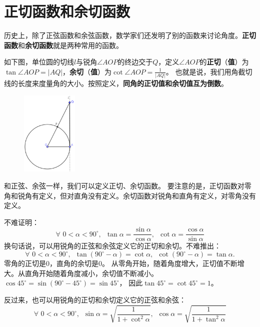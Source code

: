 \documentclass[12pt,UTF8]{ctexbook}
\begin{document}
\section{正切函数和余切函数}

历史上，除了正弦函数和余弦函数，数学家们还发明了别的函数来讨论角度。\textbf{正切函数}和\textbf{余切函数}就是两种常用的函数。

如下图，单位圆的切线$l$与锐角$\angle AOP$的终边交于$Q$，定义$\angle AOP$的\textbf{正切}（\textbf{值}）为
$\tan\angle AOP = |AQ|$，\textbf{余切}（\textbf{值}）为$\cot\angle AOP = \frac{1}{|AQ|}$。
也就是说，我们用角截切线的长度来度量角的大小。按照定义，\textbf{同角的正切值和余切值互为倒数}。

\begin{figure} %
    \vspace{-15pt}
    \flushright
    \includegraphics[width=0.24\textwidth]{tu/正切函数1.png}
\end{figure}

和正弦、余弦一样，我们可以定义正切、余切函数。
要注意的是，正切函数对零角和锐角有定义，但对直角没有定义。余切函数对锐角和直角有定义，对零角没有定义。

不难证明：
$$ \forall \,\, 0 < \alpha < 90^\circ, \,\,\, \tan \alpha = \frac{\sin \alpha}{\cos \alpha}, \,\,\, \cot \alpha = \frac{\cos \alpha}{\sin \alpha}$$
换句话说，可以用锐角的正弦和余弦定义它的正切和余切。不难推出：
$$ \forall \,\, 0 < \alpha < 90^\circ, \,\,\, \tan (90^\circ - \alpha) = \cot \alpha, \,\,\, \cot (90^\circ - \alpha) = \tan \alpha. $$
零角的正切是$0$，直角的余切是$0$。
从零角开始，随着角度增大，正切值不断增大。从直角开始随着角度减小，余切值不断减小。
$\cos 45^\circ = \sin (90^\circ - 45^\circ) = \sin 45^\circ $，
因此$\tan 45^\circ = \cot 45^\circ = 1$。

反过来，也可以用锐角的正切和余切定义它的正弦和余弦：
$$ \forall \,\, 0 < \alpha < 90^\circ, \,\,\, \sin \alpha = \sqrt{\frac{1}{1 + \cot^2 \alpha}}, \,\,\, \cos \alpha = \sqrt{\frac{1}{1 + \tan^2 \alpha}}$$
\end{document}
